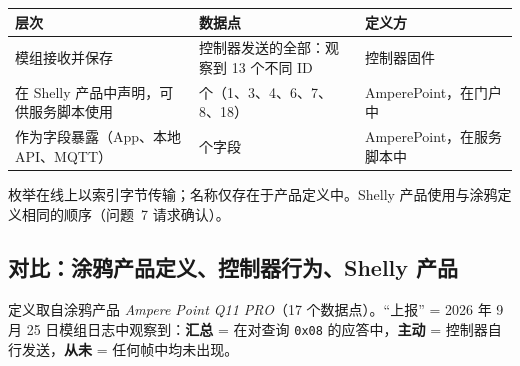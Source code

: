 \documentclass[11pt,a4paper]{article}
\newcommand{\hx}[1]{\texttt{#1}}
\begin{document}
\begin{longtable}{>{\raggedright\arraybackslash}p{6.2cm}>{\raggedright\arraybackslash}p{3.0cm}>{\raggedright\arraybackslash}p{6.9cm}}
\toprule
\rowcolor{aphead}\textbf{层次} & \textbf{数据点} & \textbf{定义方} \\
\midrule\endhead
\bottomrule\endfoot
模组接收并保存 & 控制器发送的全部：观察到 13 个不同 ID & 控制器固件 \\
在 Shelly 产品中声明，可供服务脚本使用 & 7 个（1、3、4、6、7、8、18） & AmperePoint，在门户中 \\
作为字段暴露（App、本地 API、MQTT） & 6 个字段 & AmperePoint，在服务脚本中 \\
\end{longtable}

枚举在线上以索引字节传输；名称仅存在于产品定义中。Shelly 产品使用与涂鸦定义相同的顺序（问题~7 请求确认）。

\subsection{对比：涂鸦产品定义、控制器行为、Shelly 产品}

定义取自涂鸦产品 \emph{Ampere Point Q11 PRO}（17 个数据点）。“上报” = 2026 年 9 月 25 日模组日志中观察到：\textbf{汇总} = 在对查询 \hx{0x08} 的应答中，\textbf{主动} = 控制器自行发送，\textbf{从未} = 任何帧中均未出现。
\end{document}
